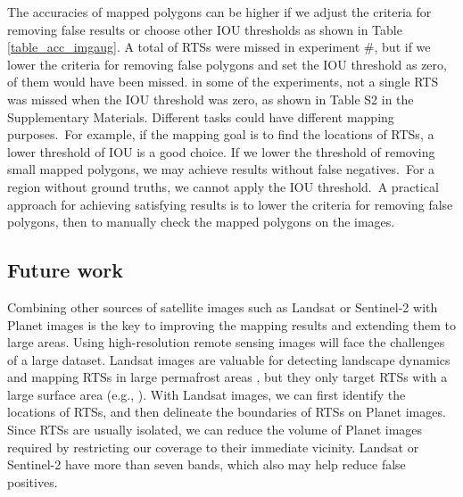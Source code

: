 \documentclass[authoryear,preprint,review,12pt]{elsarticle}
\begin{document}
The accuracies of mapped polygons can be higher if we adjust the criteria for removing false results or choose other IOU thresholds as shown in Table \ref{table_acc_imgaug}. 
A total of  RTSs were missed in experiment \#, but if we lower the criteria for removing false polygons and set the IOU threshold as zero,  of them would have been missed.  in some of the experiments, not a single RTS was missed when the IOU threshold was zero, as shown in Table S2 in the Supplementary Materials. Different tasks could have different mapping purposes.~For example, if the mapping goal is to find the locations of RTSs, a lower threshold of IOU is a good choice. If we lower the threshold of removing small mapped polygons, we may achieve results without false negatives.~For a region without ground truths, we cannot apply the IOU threshold.~A practical approach for achieving satisfying results is to lower the criteria for removing false polygons, then to manually check the mapped polygons on the images. 


\subsection{Future work}
\label{subsec_future}

Combining other sources of satellite images such as Landsat or Sentinel-2 with Planet images is the key to improving the mapping results and extending them to large areas. Using high-resolution remote sensing images will face the challenges of a large dataset. Landsat images are valuable for detecting landscape dynamics and mapping RTSs in large permafrost areas \citep{nitze_detection_2016, nitze_landsat-based_2017, nitze2018remote}, but they 
only target RTSs with a large surface area (e.g., \citealp{brooker2014investigating}). With Landsat images, we can first identify the locations of RTSs, and then delineate the boundaries of RTSs on Planet images. Since RTSs are usually isolated, we can reduce the volume of Planet images required by restricting our coverage to their immediate vicinity.
Landsat or Sentinel-2 have more than seven bands, which also may help reduce false positives. 
\end{document}
